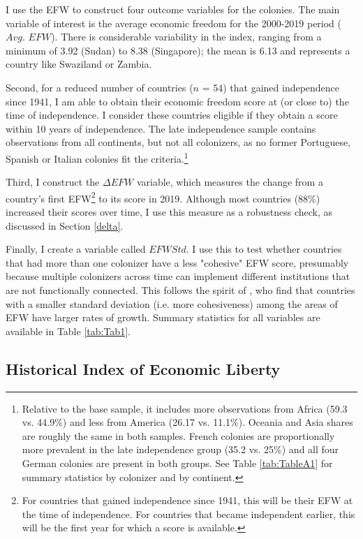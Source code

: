 \documentclass[a4paper,12pt]{article}
\begin{document}
I use the EFW to construct four outcome variables for the colonies. The main variable of interest is the average economic freedom for the 2000-2019 period ($Avg.$ $EFW$). There is considerable variability in the index, ranging from a minimum of 3.92 (Sudan) to 8.38 (Singapore); the mean is 6.13 and represents a country like Swaziland or Zambia. 

Second, for a reduced number of countries ($n$ = 54) that gained independence since 1941, I am able to obtain their economic freedom score at (or close to) the time of independence. I consider these countries eligible if they obtain a score within 10 years of independence. The late independence sample contains observations from all continents, but not all colonizers, as no former Portuguese, Spanish or Italian colonies fit the criteria.\footnote{Relative to the base sample, it includes more observations from Africa (59.3 vs. 44.9\%) and less from America (26.17 vs. 11.1\%). Oceania and Asia shares are roughly the same in both samples. French colonies are proportionally more prevalent in the late independence group (35.2 vs. 25\%) and all four German colonies are present in both groups. See Table \ref{tab:TableA1} for summary statistics by colonizer and by continent.}

Third, I construct the $\Delta EFW$ variable, which measures the change from a country's first EFW\footnote{For countries that gained independence since 1941, this will be their EFW at the time of independence. For countries that became independent earlier, this will be the first year for which a score is available.} to its score in 2019. Although most countries (88\%) increased their scores over time, I use this measure as a robustness check, as discussed in Section \ref{delta}.

Finally, I create a variable called $EFWStd$. I use this to test whether countries that had more than one colonizer have a less "cohesive" EFW score, presumably because multiple colonizers across time can implement different institutions that are not functionally connected. This follows the spirit of \cite{bolen2020does}, who find that countries with a smaller standard deviation (i.e. more cohesiveness) among the areas of EFW have larger rates of growth. Summary statistics for all variables are available in Table \ref{tab:Tab1}.

\subsection{Historical Index of Economic Liberty}\label{sec:HIEL}
\end{document}
